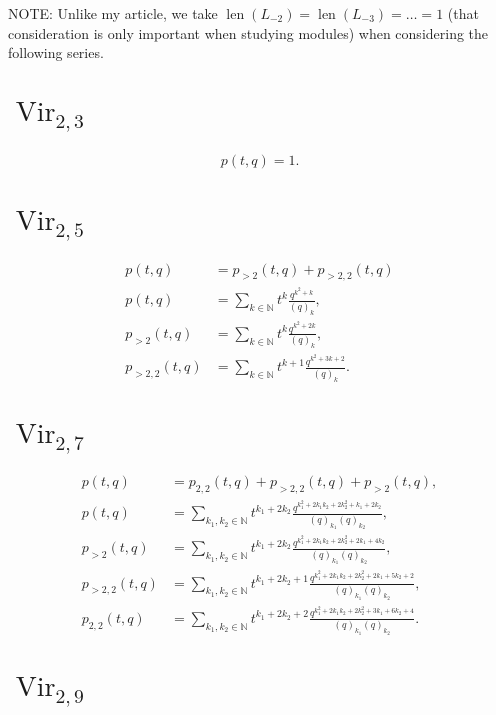 \documentclass[a4paper, 12pt, reqno]{amsart}
\DeclareMathOperator{\Vir}{Vir}
\DeclareMathOperator{\len}{len}
\begin{document}
NOTE: Unlike my article, we take $\len(L_{-2}) = \len(L_{-3}) = \dots = 1$ (that consideration is only important when studying modules) when considering the following series.

\section{$\Vir_{2, 3}$}
\label{sec:vir_2-3}

\begin{align*}
  p(t, q) = 1.
\end{align*}

\section{$\Vir_{2, 5}$}
\label{sec:vir_2-5}

\begin{align*}
  p(t, q) &= p_{>2}(t, q) + p_{>2, 2}(t, q) \\
  p(t, q) &= \sum_{k \in \mathbb{N}}t^k\frac{q^{k^2 + k}}{(q)_k}, \\
  p_{>2}(t, q) &= \sum_{k \in \mathbb{N}}t^k\frac{q^{k^2 + 2k}}{(q)_k}, \\
  p_{>2, 2}(t, q) &= \sum_{k \in \mathbb{N}}t^{k + 1}\frac{q^{k^2 + 3k + 2}}{(q)_k}.
\end{align*}

\section{$\Vir_{2, 7}$}
\label{sec:vir_2-7}

\begin{align*}
  p(t, q) &= p_{2, 2}(t, q) + p_{>2, 2}(t, q) + p_{>2}(t, q), \\
  p(t, q) &= \sum_{k_1, k_2 \in \mathbb{N}}t^{k_1 + 2k_2}\frac{q^{k_1^2 + 2k_1k_2 + 2k_2^2 + k_1 + 2k_2}}{(q)_{k_1}(q)_{k_2}}, \\
  p_{>2}(t, q) &= \sum_{k_1, k_2 \in \mathbb{N}}t^{k_1 + 2k_2}\frac{q^{k_1^2 + 2k_1k_2 + 2k_2^2 + 2k_1 + 4k_2}}{(q)_{k_1}(q)_{k_2}}, \\
  p_{>2, 2}(t, q) &= \sum_{k_1, k_2 \in \mathbb{N}}t^{k_1 + 2k_2 + 1}\frac{q^{k_1^2 + 2k_1k_2 + 2k_2^2 + 2k_1 + 5k_2 + 2}}{(q)_{k_1}(q)_{k_2}}, \\
  p_{2, 2}(t, q) &= \sum_{k_1, k_2 \in \mathbb{N}}t^{k_1 + 2k_2 + 2}\frac{q^{k_1^2 + 2k_1k_2 + 2k_2^2 + 3k_1 + 6k_2 + 4}}{(q)_{k_1}(q)_{k_2}}.
\end{align*}

\section{$\Vir_{2, 9}$}
\label{sec:vir_2-9}
\end{document}
